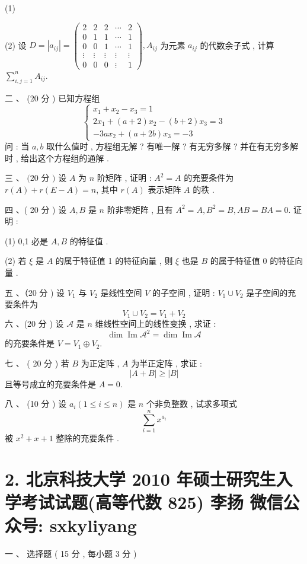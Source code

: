 \documentclass[10pt]{article}
\begin{document}
{(1)

(2)  设  $D=\left|a_{i j}\right|=\left(\begin{array}{ccccc}2 & 2 & 2 & \cdots & 2 \\ 0 & 1 & 1 & \cdots & 1 \\ 0 & 0 & 1 & \cdots & 1 \\ \vdots & \vdots & \vdots & \vdots & \vdots \\ 0 & 0 & 0 & \vdots & 1\end{array}\right), A_{i j}$  为元素  $a_{i j}$  的代数余子式 ,  计算  $\sum_{i, j=1}^{n} A_{i j}$.

 二 、 (20  分 )  已知方程组 
$$
\left\{\begin{array}{l}
x_{1}+x_{2}-x_{3}=1 \\
2 x_{1}+(a+2) x_{2}-(b+2) x_{3}=3 \\
-3 a x_{2}+(a+2 b) x_{3}=-3
\end{array}\right.
$$
 问 :  当  $a, b$  取什么值时 ,  方程组无解 ?  有唯一解 ?  有无穷多解 ?  并在有无穷多解时 ,  给出这个方程组的通解 .

 三 、 $(20$  分  $)$  设  $A$  为  $n$  阶矩阵 ,  证明 : $A^{2}=A$  的充要条件为  $r(A)+r(E-A)=n$,  其中  $r(A)$  表示矩阵  $A$  的秩 .

 四 、( 20  分 )  设  $A, B$  是  $n$  阶非零矩阵 ,  且有  $A^{2}=A, B^{2}=B, A B=B A=0$.  证明 :

(1) 0,1  必是  $A, B$  的特征值 .

(2)  若  $\xi$  是  $A$  的属于特征值  1  的特征向量 ,  则  $\xi$  也是  $B$  的属于特征值  0  的特征向量 .

 五 、（20  分 )  设  $V_{1}$  与  $V_{2}$  是线性空间  $V$  的子空间 ,  证明 : $V_{1} \cup V_{2}$  是子空间的充要条件为 
$$
V_{1} \cup V_{2}=V_{1}+V_{2}
$$
 六 、(20  分 )  设  $\mathscr{A}$  是  $n$  维线性空间上的线性变换 ,  求证 :
$$
\operatorname{dim} \operatorname{Im} \mathscr{A}^{2}=\operatorname{dim} \operatorname{Im} \mathscr{A}
$$
 的充要条件是  $V=V_{1} \oplus V_{2}$.

 七 、 ( 20  分 )  若  $B$  为正定阵 , $A$  为半正定阵 ,  求证 :
$$
|A+B| \geq|B|
$$
 且等号成立的充要条件是  $A=0$.

 八 、 (10  分 )  设  $a_{i}(1 \leq i \leq n)$  是  $n$  个非负整数 ,  试求多项式 
$$
\sum_{i=1}^{n} x^{a_{i}}
$$
 被  $x^{2}+x+1$  整除的充要条件 .

\section{2. 北京科技大学 2010 年硕士研究生入学考试试题(高等代数 825) 
 李扬 
 微信公众号: sxkyliyang}
 一 、 选择题  ( 15  分 ,  每小题  3  分 )

}
\end{document}
